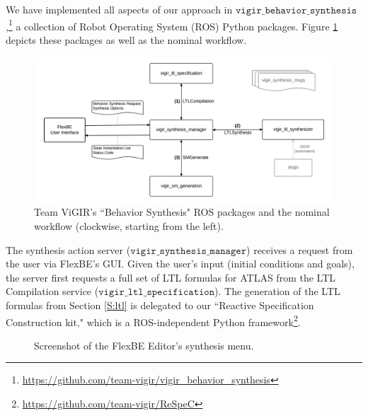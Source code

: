 
We have implemented all aspects of our approach in $\mathtt{vigir\_behavior\_synthesis}$,\footnote{\scriptsize{\url{https://github.com/team-vigir/vigir_behavior_synthesis}}}
 a collection of Robot Operating System (ROS) Python packages.
Figure \ref{Fig:vigir_behavior_synthesis} depicts these packages as well as the nominal workflow.

\begin{figure}[t]
\centering
\includegraphics[width=0.99\columnwidth,clip]{./img/behavior_synthesis_packages.png}
\caption{Team ViGIR's ``Behavior Synthesis" ROS packages and the nominal workflow (clockwise, starting from the left).
}
\label{Fig:vigir_behavior_synthesis}
\end{figure}

The synthesis action server ($\mathtt{vigir\_synthesis\_manager}$) receives a request from the user via FlexBE's GUI.
Given the user's input (initial conditions and goals), the server first requests a full set of LTL formulas for ATLAS from the LTL Compilation service ($\mathtt{vigir\_ltl\_specification}$).
The generation of the LTL formulas from Section \ref{S:ltl} is delegated to our ``Reactive Specification Construction kit," which is a ROS-independent Python framework\footnote{\scriptsize{\url{https://github.com/team-vigir/ReSpeC}}}.

\begin{figure}[t]
\centering
{}
\caption{Screenshot of the FlexBE Editor's synthesis menu.
}
\label{Fig:SynthesisMenuSimple}
\end{figure}

